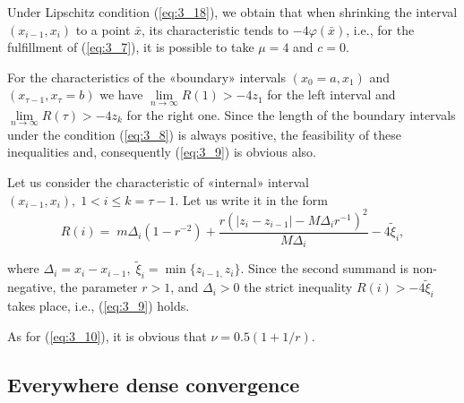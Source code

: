 	Under Lipschitz condition  (\ref{eq:3_18}), we obtain that when shrinking the interval $(x_{i-1} ,x_{i} )$ to a point $\bar{x}$, its characteristic tends to $-4\varphi (\bar{x})$, i.e., for the fulfillment of  (\ref{eq:3_7}), it is possible to take $\mu = 4$ and $c = 0$.
	
	For the characteristics of the «boundary» intervals $(x_{0} =a,x_{1} )$ and $(x_{\tau -1} ,x_{\tau } =b)$ we have $\mathop{\lim }\limits_{n\to \infty } R(1)>-4z_{1} $ for the left interval and $\mathop{\lim }\limits_{n\to \infty } R(\tau )>-4z_k$ for the right one. Since the length of the boundary intervals under the condition  (\ref{eq:3_8}) is always positive, the feasibility of these inequalities and, consequently  (\ref{eq:3_9}) is obvious also. 
	
	Let us consider the characteristic of «internal» interval $(x_{i-1} ,x_{i} ),\; 1<i\le k=\tau -1$. Let us write it in the form 
	\begin{equation*}
	R(i)=\; m\Delta _{i} (1-r^{-2} )+\frac{r(\left|z_{i} -z_{i-1} \right|-M\Delta _{i} r^{-1} )^{2} }{M\Delta _{i} } -4\tilde{\xi }_{i},
	\end{equation*}
	
	where $\Delta _{i} =x_{i} -x_{i-1} ,\; \tilde{\xi }_{i} =\min \{ z_{i-1,} z_{i} \} $. Since the second summand is non-negative, the parameter $r>1$, and $\Delta _{i} >0$ the strict inequality $R(i)>-4\tilde{\xi }_{i} $ takes place, i.e.,  (\ref{eq:3_9}) holds.
	
	As for  (\ref{eq:3_10}), it is obvious that  $\nu =0.5(1+1/r)$.
	
	\noindent 
	\subsection{Everywhere dense convergence}
	
